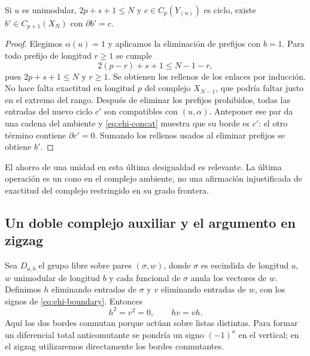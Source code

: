 \begin{lema}
\label{lem:ehi-one}
Si $u$ es unimodular, $2p+s+1\le N$ y $c\in C_p(Y_{(u)})$ es ciclo, existe $b'\in C_{p+1}(X_N)$ con $\partial b'=c$.
\end{lema}
\begin{proof}
Elegimos $\alpha(u)=1$ y aplicamos la eliminación de prefijos con $b=1$. Para todo prefijo de longitud $r\ge1$ se cumple
\[
 2(p-r)+s+1\le N-1-r,
\]
pues $2p+s+1\le N$ y $r\ge1$. Se obtienen los rellenos de los enlaces por inducción. No hace falta exactitud en longitud $p$ del complejo $X_{N-1}$, que podría faltar justo en el extremo del rango. Después de eliminar los prefijos prohibidos, todas las entradas del nuevo ciclo $c'$ son compatibles con $(u,\alpha)$. Anteponer ese par da una cadena del ambiente y \eqref{eq:ehi-concat} muestra que su borde es $c'$: el otro término contiene $\partial c'=0$. Sumando los rellenos usados al eliminar prefijos se obtiene $b'$.
\end{proof}

El ahorro de una unidad en esta última desigualdad es relevante. La última operación es un cono en el complejo ambiente, no una afirmación injustificada de exactitud del complejo restringido en su grado frontera.

\subsection{Un doble complejo auxiliar y el argumento en zigzag}

Sea $D_{a,b}$ el grupo libre sobre pares $(\sigma,w)$, donde $\sigma$ es escindida de longitud $a$, $w$ unimodular de longitud $b$ y cada funcional de $\sigma$ anula los vectores de $w$. Definimos $h$ eliminando entradas de $\sigma$ y $v$ eliminando entradas de $w$, con los signos de \eqref{eq:ehi-boundary}. Entonces
\begin{equation}
 h^2=v^2=0,\qquad hv=vh.
 \label{eq:ehi-comm}
\end{equation}
Aquí los dos bordes conmutan porque actúan sobre listas distintas. Para formar un diferencial total anticomutante se pondría un signo $(-1)^a$ en el vertical; en el zigzag utilizaremos directamente los bordes conmutantes.

